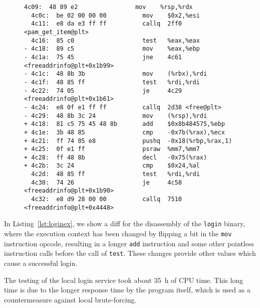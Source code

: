 \begin{figure}
\begin{minipage}{\linewidth}
\begin{lstlisting}[style=diff,
                   caption={Diff for the disassembly after an exploitable
bitflip was applied to the \texttt{login} binary in order to bypass the
credential check. Changing the instruction for \texttt{mov} to an \texttt{add}
with addressing modes sets changes the execution calls until the \texttt{test}
instruction is called. These changes affect register values and the outcome of
the program.},
label=lst:loginex]
  4c09:  48 89 e2                mov    %rsp,%rdx
  4c0c:  be 02 00 00 00          mov    $0x2,%esi
  4c11:  e8 da e3 ff ff          callq  2ff0 <pam_get_item@plt>
  4c16:  85 c0                   test   %eax,%eax
- 4c18:  89 c5                   mov    %eax,%ebp
- 4c1a:  75 45                   jne    4c61 <freeaddrinfo@plt+0x1b99>
- 4c1c:  48 8b 3b                mov    (%rbx),%rdi
- 4c1f:  48 85 ff                test   %rdi,%rdi
- 4c22:  74 05                   je     4c29 <freeaddrinfo@plt+0x1b61>
- 4c24:  e8 0f e1 ff ff          callq  2d38 <free@plt>
- 4c29:  48 8b 3c 24             mov    (%rsp),%rdi
+ 4c18:  81 c5 75 45 48 8b       add    $0x8b484575,%ebp
+ 4c1e:  3b 48 85                cmp    -0x7b(%rax),%ecx
+ 4c21:  ff 74 05 e8             pushq  -0x18(%rbp,%rax,1)
+ 4c25:  0f e1 ff                psraw  %mm7,%mm7
+ 4c28:  ff 48 8b                decl   -0x75(%rax)
+ 4c2b:  3c 24                   cmp    $0x24,%al
  4c2d:  48 85 ff                test   %rdi,%rdi
  4c30:  74 26                   je     4c58 <freeaddrinfo@plt+0x1b90>
  4c32:  e8 d9 28 00 00          callq  7510 <freeaddrinfo@plt+0x4448>
\end{lstlisting}
\end{minipage}
\end{figure}

In Listing~\ref{lst:loginex}, we show a diff for the disassembly of the
\texttt{login} binary, where the execution context has been changed by flipping
a bit in the \texttt{mov} instruction opcode, resulting in a longer
\texttt{add} instruction and some other pointless instruction calls before the
call of \texttt{test}. These changes provide other values which cause a
successful login.

The testing of the local login service took about \SI{35}{\hour} of CPU time.
This long time is due to the longer response time by the program itself, which
is used as a countermeasure against local brute-forcing.


